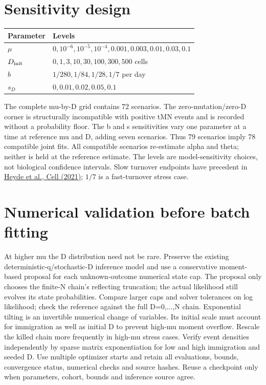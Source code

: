 \documentclass[11pt]{article}
\begin{document}
\section{Sensitivity design}
\begin{center}\begin{tabular}{lp{.75\linewidth}}\toprule Parameter & Levels\\\midrule
$\mu$ & $0,10^{-6},10^{-5},10^{-4},0.001,0.003,0.01,0.03,0.1$\\
$D_{\rm init}$ & $0,1,3,10,30,100,300,500$ cells\\
$b$ & $1/280,1/84,1/28,1/7$ per day\\
$s_D$ & $0,0.01,0.02,0.05,0.1$\\\bottomrule\end{tabular}\end{center}
The complete mu-by-D grid contains 72 scenarios. The zero-mutation/zero-D corner is structurally incompatible with positive tMN events and is recorded without a probability floor. The b and s sensitivities vary one parameter at a time at reference mu and D, adding seven scenarios. Thus 79 scenarios imply 78 compatible joint fits. All compatible scenarios re-estimate alpha and theta; neither is held at the reference estimate.
The levels are model-sensitivity choices, not biological confidence intervals. Slow turnover endpoints have precedent in \href{https://pmc.ncbi.nlm.nih.gov/articles/PMC8109274/}{Heyde et al., Cell (2021)}; $1/7$ is a fast-turnover stress case.
\section{Numerical validation before batch fitting}
At higher mu the D distribution need not be rare. Preserve the existing deterministic-q/stochastic-D inference model and use a conservative moment-based proposal for each unknown-outcome numerical state cap. The proposal only chooses the finite-N chain's reflecting truncation; the actual likelihood still evolves its state probabilities. Compare larger caps and solver tolerances on log likelihood; check the reference against the full D=0,...,N chain.
Exponential tilting is an invertible numerical change of variables. Its initial scale must account for immigration as well as initial D to prevent high-mu moment overflow. Rescale the killed chain more frequently in high-mu stress cases. Verify event densities independently by sparse matrix exponentiation for low and high immigration and seeded D.
Use multiple optimizer starts and retain all evaluations, bounds, convergence status, numerical checks and source hashes. Reuse a checkpoint only when parameters, cohort, bounds and inference source agree.
\end{document}
